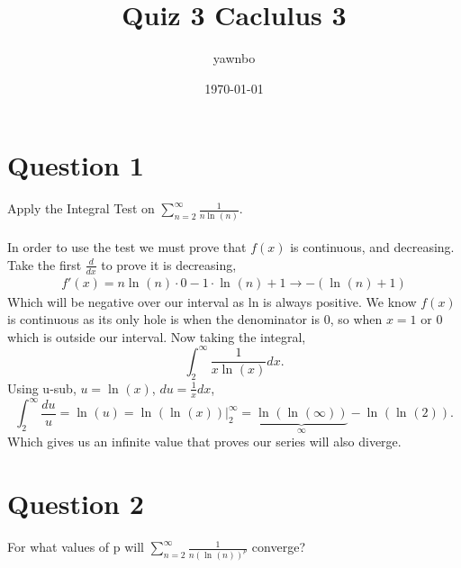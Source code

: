 \documentclass[a4paper]{article}
\title{Quiz 3 Caclulus 3}
\author{yawnbo}
\date{\today}
\begin{document}
\maketitle
\section*{Question 1}%
\label{sec:Question 1}
Apply the Integral Test on $ \sum_{ n=2 } ^{ \infty } \frac{ 1 }{ n\ln^{  } \left( n \right)  }  $. \\ \\
In order to use the test we must prove that $ f\left( x \right)  $ is continuous, and decreasing. Take the first $ \frac{ d }{ dx }  $ to prove it is decreasing, 
\begin{gather*}
f'\left( x \right) =  n\ln^{  } \left( n \right) \cdot 0 - 1 \cdot \ln^{  } \left( n \right) +1 \to -\left( \ln^{  } \left( n \right) +1 \right) 
\end{gather*}
Which will be negative over our interval as ln is always positive. We know $ f\left( x \right)  $ is continuous as its only hole is when the denominator is 0, so when $ x=1 \text{ or } 0  $ which is outside our interval. Now taking the integral,
\[
\int_{ 2 }^{ \infty } \frac{ 1 }{ x\ln^{  } \left( x \right)  } dx
.\] 
Using u-sub, $ u = \ln^{  } \left( x \right)  $, $ du = \frac{ 1 }{ x } dx $,
\[
	\int_{ 2 }^{ \infty } \frac{ du }{ u } = \ln^{  } \left( u \right) = \ln^{  } \left( \ln^{  } \left( x \right)  \right) \big|_{ 2 }^{ \infty } = \underbrace{\ln^{  } \left( \ln^{  } \left( \infty \right)  \right) }_{\infty} - \ln^{  } \left( \ln^{  } \left( 2 \right)  \right) 
.\] 
Which gives us an infinite value that proves our series will also diverge. 

\section*{Question 2}%
\label{sec:Question 2}
For what values of p will $ \sum_{ n=2 } ^{ \infty } \frac{ 1 }{ n\left( \ln^{  } \left( n \right)  \right) ^{ p } }  $ converge?
\end{document}
